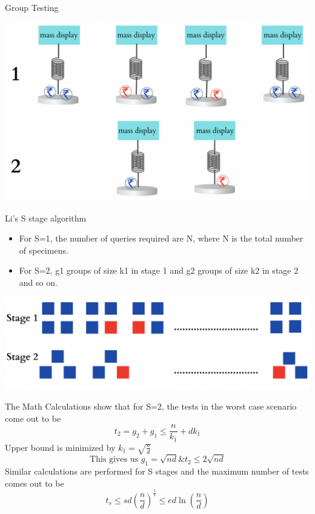 \documentclass{beamer} %
\begin{document}
\begin{frame}
	\begin{block}{Group Testing}
		
	\end{block}
	\begin{center}
		\includegraphics[scale = 0.4]{Figures/amrit3.png}
	\end{center}
\end{frame}
\begin{frame}
	\begin{block}{Li's S stage algorithm}
		\begin{itemize}
			\item For S=1, the number of queries required are N, where N is the total number of specimens. 
			\item For S=2, g1 groups of size k1 in stage 1 and g2 groups of size k2 in stage 2 and so on.
		\end{itemize}
		
	\end{block}
	\begin{center}
		\includegraphics[scale = 0.4]{Figures/amrit4.png}
	\end{center}
\end{frame}
\begin{frame}
	\begin{block}{The Math}
		Calculations show that for S=2, the tests in the worst case scenario come out to be
		\[
			t_2 = g_2 + g_1 \leq \frac{n}{k_1} + d k_1
		\]
		Upper bound is minimized by \(k_1 = \sqrt{\frac{n}{d}} \) 
		\[
			\text{This gives us } g_1 = \sqrt{nd} \& t_2 \leq 2\sqrt{nd} 
		\]
		Similar calculations are performed for S stages and the maximum number of tests comes out to be 
		\[
			t_s \leq sd\left(\frac{n}{d}\right)^\frac{1}{s} \leq ed \ln \left(\frac{n}{d}\right)
		\]
	\end{block}
\end{frame}
	
\end{document}
